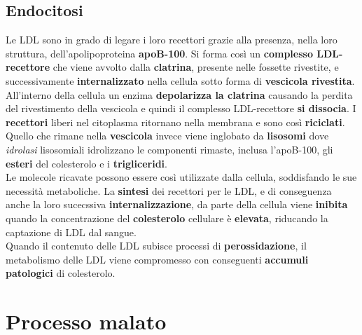 \documentclass[a4paper, 12pt]{article}
\begin{document}
\begin{titlepage}
\subsection{Endocitosi}
Le LDL sono in grado di legare i loro recettori grazie alla presenza, nella loro struttura, dell’apolipoproteina \textbf{apoB-100}. Si forma così un \textbf{complesso LDL-recettore} che viene avvolto dalla \textbf{clatrina}, presente nelle fossette rivestite, e successivamente \textbf{internalizzato} nella cellula sotto forma di \textbf{vescicola rivestita}.\\
All’interno della cellula un enzima \textbf{depolarizza la clatrina} causando la perdita del rivestimento della vescicola e quindi il complesso LDL-recettore \textbf{si dissocia}. I \textbf{recettori} liberi nel citoplasma ritornano nella membrana e sono così \textbf{riciclati}. Quello che rimane nella \textbf{vescicola} invece viene inglobato da \textbf{lisosomi} dove \textit{idrolasi} lisosomiali idrolizzano le componenti rimaste, inclusa l’apoB-100, gli \textbf{esteri} del colesterolo e i \textbf{trigliceridi}.\\
Le molecole ricavate possono essere così utilizzate dalla cellula, soddisfando le sue necessità metaboliche. La \textbf{sintesi} dei recettori per le LDL, e di conseguenza anche la loro sucecssiva \textbf{internalizzazione}, da parte della cellula viene \textbf{inibita} quando la concentrazione del \textbf{colesterolo} cellulare è \textbf{elevata}, riducando la captazione di LDL dal sangue.\\ Quando il contenuto delle LDL subisce processi di \textbf{perossidazione}, il metabolismo delle LDL viene compromesso con conseguenti \textbf{accumuli patologici} di colesterolo.

\section{Processo malato}


\end{titlepage}
\end{document}
